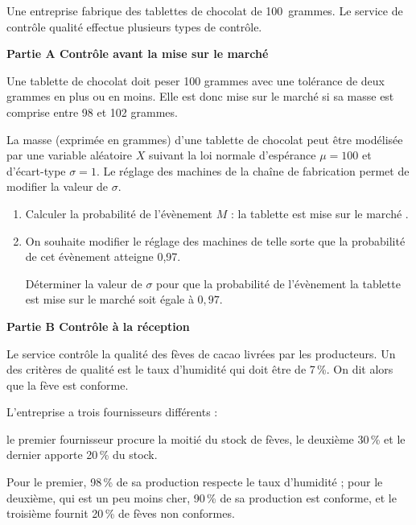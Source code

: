 \documentclass[12pt,frenchb]{article}
\begin{document}
\begin{question}[subtitle={Amérique du Nord 2015}]
Une entreprise fabrique des tablettes de chocolat de 100~grammes. Le service de contrôle qualité effectue plusieurs types de contrôle. 

\bigskip

\textbf{Partie A Contrôle avant la mise sur le marché}

\medskip
 

Une tablette de chocolat doit peser 100 grammes avec une tolérance de deux grammes en plus ou en moins. Elle est donc mise sur le marché si sa masse est comprise entre 98 et 102 grammes. 

La masse (exprimée en grammes) d'une tablette de chocolat peut être modélisée par une variable aléatoire $X$ suivant la loi normale d'espérance $\mu = 100$ et d'écart-type $\sigma = 1$. Le réglage des machines de la chaîne de fabrication permet de modifier la valeur de $\sigma$. 

\medskip

\begin{enumerate}
\item Calculer la probabilité de l'évènement $M$ : \og la tablette est mise sur le marché \fg. 
\item On souhaite modifier le réglage des machines de telle sorte que la probabilité de cet évènement atteigne 0,97. 

Déterminer la valeur de $\sigma$ pour que la probabilité de l'évènement \og la tablette est mise sur le marché\fg{} soit égale à $0,97$. 
\end{enumerate}

\bigskip

\textbf{Partie B Contrôle à la réception}

\medskip 

Le service contrôle la qualité des fèves de cacao livrées par les producteurs. Un des critères de qualité est le taux d'humidité qui doit être de 7\,\%. On dit alors que la fève est conforme. 

L'entreprise a trois fournisseurs différents : 

le premier fournisseur procure la moitié du stock de fèves, le deuxième 30\,\% et le dernier apporte 20\,\% du stock. 

Pour le premier, 98\,\% de sa production respecte le taux d'humidité ; pour le deuxième, qui est un peu moins cher, 90\,\% de sa production est conforme, et le troisième fournit 20\,\% de fèves non conformes. 


\end{question}
\end{document}
